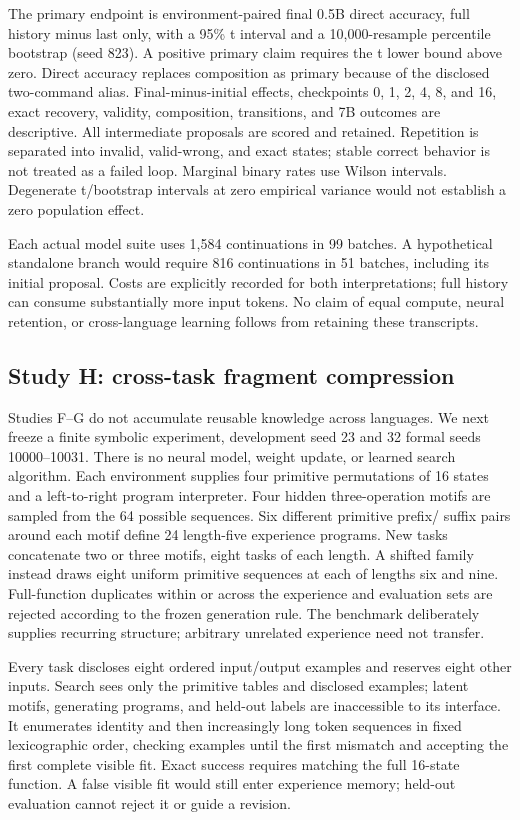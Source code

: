 \documentclass[11pt]{article}
\begin{document}
The primary endpoint is environment-paired final 0.5B direct accuracy,
full history minus last only, with a 95\% t interval and a 10,000-resample
percentile bootstrap (seed 823). A positive primary claim requires the t
lower bound above zero. Direct accuracy replaces composition as primary
because of the disclosed two-command alias. Final-minus-initial effects,
checkpoints 0, 1, 2, 4, 8, and 16, exact recovery, validity, composition,
transitions, and 7B outcomes are descriptive. All intermediate proposals
are scored and retained. Repetition is separated into invalid, valid-wrong,
and exact states; stable correct behavior is not treated as a failed loop.
Marginal binary rates use Wilson intervals. Degenerate t/bootstrap intervals
at zero empirical variance would not establish a zero population effect.

Each actual model suite uses 1,584 continuations in 99 batches. A hypothetical
standalone branch would require 816 continuations in 51 batches, including its
initial proposal. Costs are explicitly recorded for both interpretations;
full history can consume substantially more input tokens. No claim of equal
compute, neural retention, or cross-language learning follows from retaining
these transcripts.

\subsection{Study H: cross-task fragment compression}
Studies F--G do not accumulate reusable knowledge across languages. We next
freeze a finite symbolic experiment, development seed 23 and 32 formal seeds
10000--10031. There is no neural model, weight update, or learned search
algorithm. Each environment supplies four primitive permutations of 16 states
and a left-to-right program interpreter. Four hidden three-operation motifs
are sampled from the 64 possible sequences. Six different primitive prefix/
suffix pairs around each motif define 24 length-five experience programs.
New tasks concatenate two or three motifs, eight tasks of each length. A
shifted family instead draws eight uniform primitive sequences at each of
lengths six and nine. Full-function duplicates within or across the experience
and evaluation sets are rejected according to the frozen generation rule.
The benchmark deliberately supplies recurring structure; arbitrary unrelated
experience need not transfer.

Every task discloses eight ordered input/output examples and reserves eight
other inputs. Search sees only the primitive tables and disclosed examples;
latent motifs, generating programs, and held-out labels are inaccessible to
its interface. It enumerates identity and then increasingly long token
sequences in fixed lexicographic order, checking examples until the first
mismatch and accepting the first complete visible fit. Exact success requires
matching the full 16-state function. A false visible fit would still enter
experience memory; held-out evaluation cannot reject it or guide a revision.
\end{document}
